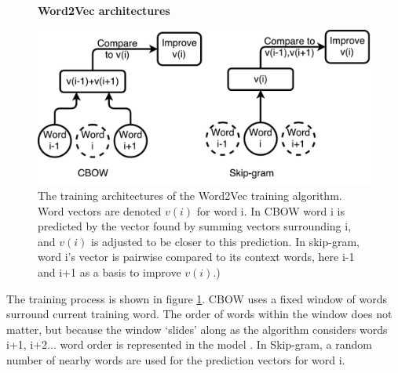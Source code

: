 \begin{figure}[H]
    \centering
    \textbf{Word2Vec architectures}\par\medskip
    \includegraphics[scale=0.8]{Natural_Language_Processing/cbow_v_skip.pdf}
    \caption{The training architectures of the Word2Vec training algorithm. Word vectors are denoted $v(i)$ for word i. In CBOW word i is predicted by the vector found by summing vectors surrounding i, and $v(i)$ is adjusted to be closer to this prediction. In skip-gram, word i's vector is pairwise compared to its context words, here i-1 and i+1 as a basis to improve $v(i)$.)}
     \label{fig:CBOWSKIP}
\end{figure}

The training process is shown in figure \ref{fig:CBOWSKIP}. CBOW uses a fixed window of words surround current training word. The order of words within the window does not matter, but because the window `slides' along as the algorithm considers words i+1, i+2... word order is represented in the model . In Skip-gram, a random number of nearby words are used for the prediction vectors for word i. 


